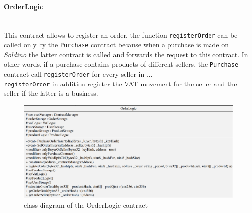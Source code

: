 \paragraph{OrderLogic}\mbox{}\\

\noindent This contract allows to register an order, the function \texttt{registerOrder} can be called only by the \texttt{Purchase} contract because when a purchase is made on \textit{Soldino} the latter contract is called and forwards the request to this contract. In other words, if a purchase contains products of different sellers, the \texttt{Purchase} contract call \texttt{registerOrder} for every seller in ... \\
\texttt{registerOrder} in addition register the VAT movement for the seller and the seller if the latter is a business.
\begin{figure}[H]
	\centering
	\includegraphics[scale=0.25]{res/images/solidity/orderlogic.png}
	\caption{class diagram of the OrderLogic contract}
\end{figure}